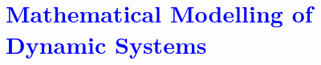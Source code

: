 \documentclass[../notes-main.tex]{subfiles}
\begin{document}
\chapter{\textcolor{blue}{Mathematical Modelling of Dynamic Systems}}
\end{document}
